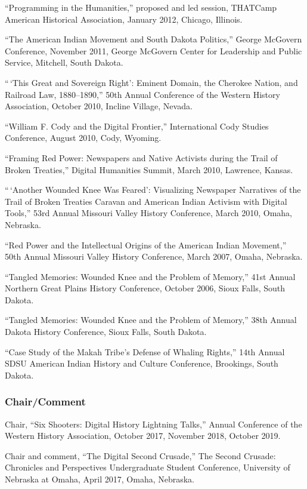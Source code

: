 ``Programming in the Humanities,'' proposed and led session, THATCamp
American Historical Association, January 2012, Chicago, Illinois.

``The American Indian Movement and South Dakota Politics,'' George
McGovern Conference, November 2011, George McGovern Center for
Leadership and Public Service, Mitchell, South Dakota.

``\,`This Great and Sovereign Right': Eminent Domain, the Cherokee
Nation, and Railroad Law, 1880--1890,'' 50th Annual Conference of the
Western History Association, October 2010, Incline Village, Nevada.

``William F. Cody and the Digital Frontier,'' International Cody Studies
Conference, August 2010, Cody, Wyoming.

``Framing Red Power: Newspapers and Native Activists during the Trail of
Broken Treaties,'' Digital Humanities Summit, March 2010, Lawrence,
Kansas.

``\,`Another Wounded Knee Was Feared': Visualizing Newspaper Narratives
of the Trail of Broken Treaties Caravan and American Indian Activism
with Digital Tools,'' 53rd Annual Missouri Valley History Conference,
March 2010, Omaha, Nebraska.

``Red Power and the Intellectual Origins of the American Indian
Movement,'' 50th Annual Missouri Valley History Conference, March 2007,
Omaha, Nebraska.

``Tangled Memories: Wounded Knee and the Problem of Memory,'' 41st
Annual Northern Great Plains History Conference, October 2006, Sioux
Falls, South Dakota.

``Tangled Memories: Wounded Knee and the Problem of Memory,'' 38th
Annual Dakota History Conference, Sioux Falls, South Dakota.

``Case Study of the Makah Tribe's Defense of Whaling Rights,'' 14th
Annual SDSU American Indian History and Culture Conference, Brookings,
South Dakota.

\subsubsection{Chair/Comment}\label{chaircomment}

Chair, ``Six Shooters: Digital History Lightning Talks,'' Annual
Conference of the Western History Association, October 2017, November
2018, October 2019.

Chair and comment, ``The Digital Second Crusade,'' The Second Crusade:
Chronicles and Perspectives Undergraduate Student Conference, University
of Nebraska at Omaha, April 2017, Omaha, Nebraska.

